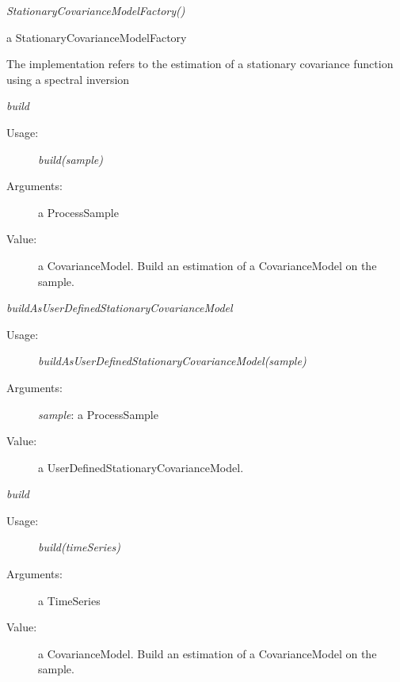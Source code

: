 \begin{description}

\item[Usage:] \rule{0pt}{1em}
\begin{description}
\item \textit{StationaryCovarianceModelFactory()}
\end{description}
\bigskip

\item[Value:] a StationaryCovarianceModelFactory
\rule{0pt}{1em}
\begin{description}
\item The implementation refers to the estimation of a stationary covariance function using a spectral inversion
\end{description}
\bigskip

\item[Some methods :]  \rule{0pt}{1em}

\begin{description}

\item \textit{build}
\begin{description}
\item[Usage:] \textit{build(sample)}
\item[Arguments:] a ProcessSample
\item[Value:]   a CovarianceModel. Build an estimation of a CovarianceModel on the sample.
\end{description}
\bigskip

\item \textit{buildAsUserDefinedStationaryCovarianceModel}
\begin{description}
\item[Usage:] \textit{buildAsUserDefinedStationaryCovarianceModel(sample)}
\item[Arguments:] \textit{sample}: a ProcessSample
\item[Value:]   a UserDefinedStationaryCovarianceModel.
\end{description}
\bigskip

\item \textit{build}
\begin{description}
\item[Usage:] \textit{build(timeSeries)}
\item[Arguments:] a TimeSeries
\item[Value:]   a CovarianceModel. Build an estimation of a CovarianceModel on the sample.
\end{description}
\bigskip


\end{description}
\end{description}

